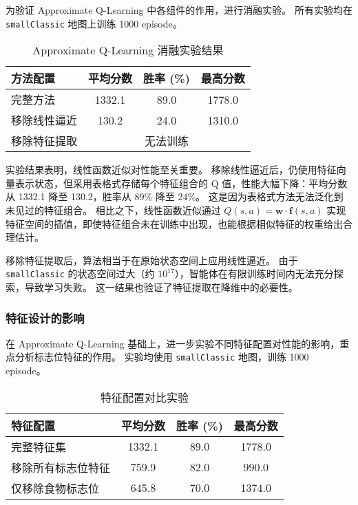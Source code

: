 为验证 Approximate Q-Learning 中各组件的作用，进行消融实验。
所有实验均在 \texttt{smallClassic} 地图上训练 1000 episode。

\begin{table}[h]
    \renewcommand{\arraystretch}{1.5}
    \setlength{\tabcolsep}{10pt}
    \centering
    \caption{Approximate Q-Learning 消融实验结果}
    \small
    \begin{tabular}{lccc}
        \toprule
        \textbf{方法配置} & \textbf{平均分数} & \textbf{胜率 (\%)} & \textbf{最高分数} \\
        \midrule
        完整方法 & 1332.1 & 89.0 & 1778.0 \\
        移除线性逼近 & 130.2 & 24.0 & 1310.0 \\
        移除特征提取 & \multicolumn{3}{c}{无法训练} \\
        \bottomrule
    \end{tabular}
    \label{tab:ablation_approx_q}
\end{table}

实验结果表明，线性函数近似对性能至关重要。
移除线性逼近后，仍使用特征向量表示状态，但采用表格式存储每个特征组合的 Q 值，性能大幅下降：平均分数从 1332.1 降至 130.2，胜率从 89\% 降至 24\%。
这是因为表格式方法无法泛化到未见过的特征组合。
相比之下，线性函数近似通过 $Q(s,a) = \mathbf{w} \cdot \mathbf{f}(s,a)$ 实现特征空间的插值，即使特征组合未在训练中出现，也能根据相似特征的权重给出合理估计。

移除特征提取后，算法相当于在原始状态空间上应用线性逼近。
由于 \texttt{smallClassic} 的状态空间过大（约 $10^{17}$），智能体在有限训练时间内无法充分探索，导致学习失败。
这一结果也验证了特征提取在降维中的必要性。

\subsubsection{特征设计的影响}

在 Approximate Q-Learning 基础上，进一步实验不同特征配置对性能的影响，重点分析标志位特征的作用。
实验均使用 \texttt{smallClassic} 地图，训练 1000 episode。

\begin{table}[h]
    \renewcommand{\arraystretch}{1.5}
    \setlength{\tabcolsep}{8pt}
    \centering
    \caption{特征配置对比实验}
    \small
    \begin{tabular}{lccc}
        \toprule
        \textbf{特征配置} & \textbf{平均分数} & \textbf{胜率 (\%)} & \textbf{最高分数} \\
        \midrule
        完整特征集 & 1332.1 & 89.0 & 1778.0 \\
        移除所有标志位特征 & 759.9 & 82.0 & 990.0 \\
        仅移除食物标志位 & 645.8 & 70.0 & 1374.0 \\
        \bottomrule
    \end{tabular}
    \label{tab:ablation_features}
\end{table}

